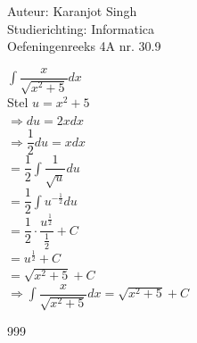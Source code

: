 \documentclass[a4paper]{article}
\begin{document}
\noindent \large Auteur: Karanjot Singh \\
\noindent \large Studierichting: Informatica \\
\noindent \large Oefeningenreeks 4A nr. 30.9 \\

\normalsize

$\displaystyle\int \dfrac{x}{\sqrt{x^2 + 5}} dx$ \\

Stel $u = x^2 + 5$ \\

$\Rightarrow du = 2x dx$ \\

$\Rightarrow \dfrac{1}{2} du = x dx$ \\

$= \dfrac{1}{2} \displaystyle\int \dfrac{1}{\sqrt{u}} du$ \\

$= \dfrac{1}{2} \displaystyle\int u^{-\tfrac{1}{2}} du$ \\

$= \dfrac{1}{2} \cdot \dfrac{u^{\tfrac{1}{2}}}{\tfrac{1}{2}} + C$ \\

$= u^{\tfrac{1}{2}} + C$ \\

$= \sqrt{x^2 + 5} + C$ \\

$\Rightarrow \displaystyle\int \dfrac{x}{\sqrt{x^2 + 5}} dx = \sqrt{x^2 + 5} + C$ \\

\begin{thebibliography}{999}
\end{thebibliography}
\end{document}
